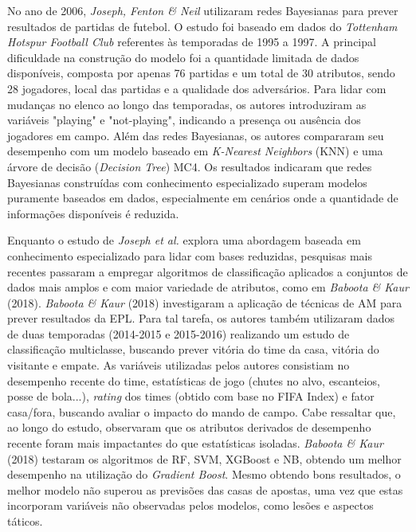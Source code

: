 No ano de 2006, \textit{Joseph, Fenton \& Neil} utilizaram redes Bayesianas para prever resultados de partidas de futebol. 
O estudo foi baseado em dados do \textit{Tottenham Hotspur Football Club} referentes às temporadas de 1995 a 1997. 
A principal dificuldade na construção do modelo foi a quantidade limitada de dados disponíveis, composta por apenas 76 partidas e um total de 30 atributos, 
sendo 28 jogadores, local das partidas e a qualidade dos adversários.
Para lidar com mudanças no elenco ao longo das temporadas, os autores introduziram as variáveis "playing" e "not-playing", 
indicando a presença ou ausência dos jogadores em campo. Além das redes Bayesianas, os autores compararam seu desempenho com um modelo baseado em 
\textit{K-Nearest Neighbors} (KNN) e uma árvore de decisão (\textit{Decision Tree}) MC4. 
Os resultados indicaram que redes Bayesianas construídas com conhecimento especializado superam modelos puramente baseados em dados, 
especialmente em cenários onde a quantidade de informações disponíveis é reduzida. 

Enquanto o estudo de \textit{Joseph et al.} explora uma abordagem baseada em conhecimento especializado para lidar com bases reduzidas, pesquisas mais recentes 
passaram a empregar algoritmos de classificação aplicados a conjuntos de dados mais amplos e com maior variedade de atributos, como em \textit{Baboota & Kaur} (2018).
\textit{Baboota \& Kaur} (2018) investigaram a aplicação de técnicas de AM para prever resultados da EPL. 
Para tal tarefa, os autores também utilizaram dados de duas temporadas (2014-2015 e 2015-2016) realizando um estudo de classificação multiclasse, 
buscando prever vitória do time da casa, vitória do visitante e empate.
As variáveis utilizadas pelos autores consistiam no desempenho recente do time, estatísticas de jogo (chutes no alvo, escanteios, posse de bola...), 
\textit{rating} dos times (obtido com base no FIFA Index) e fator casa/fora, buscando avaliar o impacto do mando de campo. 
Cabe ressaltar que, ao longo do estudo, observaram que os atributos derivados de desempenho recente foram mais impactantes do que estatísticas isoladas.
\textit{Baboota \& Kaur} (2018) testaram os algoritmos de RF, SVM, XGBoost e NB, obtendo um melhor desempenho na utilização do \textit{Gradient Boost}. 
Mesmo obtendo bons resultados, o melhor modelo não superou as previsões das casas de apostas, uma vez que estas incorporam variáveis não observadas pelos 
modelos, como lesões e aspectos táticos.

